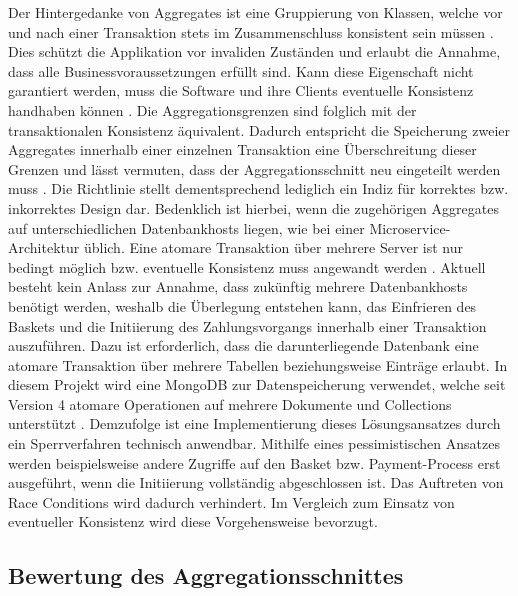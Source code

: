 Der Hintergedanke von Aggregates ist eine Gruppierung von Klassen, welche vor und nach einer Transaktion stets im Zusammenschluss konsistent sein müssen \cite[S. 128f.]{Evans.2011}. Dies schützt die Applikation vor invaliden Zuständen und erlaubt die Annahme, dass alle Businessvoraussetzungen erfüllt sind. Kann diese Eigenschaft nicht garantiert werden, muss die Software und ihre Clients eventuelle Konsistenz handhaben können \cite[S. 364]{Vernon.2015}. Die Aggregationsgrenzen sind folglich mit der transaktionalen Konsistenz äquivalent. Dadurch entspricht die Speicherung zweier Aggregates innerhalb einer einzelnen Transaktion eine Überschreitung dieser Grenzen und lässt vermuten, dass der Aggregationsschnitt neu eingeteilt werden muss \cite[S. 358f.]{Vernon.2015}. Die Richtlinie stellt dementsprechend lediglich ein Indiz für korrektes bzw. inkorrektes Design  dar. Bedenklich ist hierbei, wenn die zugehörigen Aggregates auf unterschiedlichen Datenbankhosts liegen, wie bei einer Microservice-Architektur üblich. Eine atomare Transaktion über mehrere Server ist nur bedingt möglich bzw. eventuelle Konsistenz muss angewandt werden \cite{Fowler.2014}. Aktuell besteht kein Anlass zur Annahme, dass zukünftig mehrere Datenbankhosts benötigt werden, weshalb die Überlegung entstehen kann, das Einfrieren des Baskets und die Initiierung des Zahlungsvorgangs innerhalb einer Transaktion auszuführen. Dazu ist erforderlich, dass die darunterliegende Datenbank eine atomare Transaktion über mehrere Tabellen beziehungsweise Einträge erlaubt. In diesem Projekt wird eine MongoDB zur Datenspeicherung verwendet, welche seit Version 4 atomare Operationen auf mehrere Dokumente und Collections unterstützt \cite{mongodb.atomicity}. Demzufolge ist eine Implementierung dieses Lösungsansatzes durch ein Sperrverfahren technisch anwendbar. Mithilfe eines pessimistischen Ansatzes werden beispielsweise andere Zugriffe auf den Basket bzw. Payment-Process erst ausgeführt, wenn die Initiierung vollständig abgeschlossen ist. Das Auftreten von Race Conditions wird dadurch verhindert. \cite{Graefe.2016} Im Vergleich zum Einsatz von eventueller Konsistenz wird diese Vorgehensweise bevorzugt.

\subsection{Bewertung des Aggregationsschnittes}

